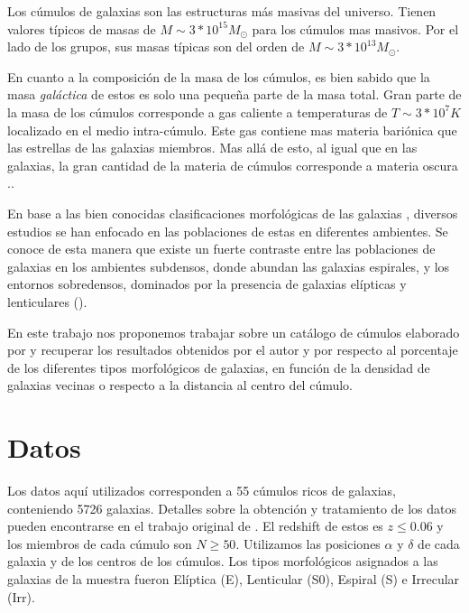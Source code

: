 \documentclass[a4paper,10pt]{article}
\begin{document}
Los c\'umulos de galaxias son las estructuras m\'as masivas del universo. Tienen valores t\'ipicos de masas de $M\sim 3*10^{15}M_{\odot}$ para los c\'umulos mas masivos. Por el lado de los grupos, sus masas t\'ipicas son del orden de $M\sim3*10^{13}M_{\odot}$. 

En cuanto a la composici\'on de la masa de los c\'umulos, es bien sabido que la masa \textit{gal\'actica} de estos es solo una peque\~na parte de la masa total. Gran parte de la masa de los c\'umulos corresponde a gas caliente a temperaturas de $T\sim3*10^{7}K$ localizado en el medio intra-c\'umulo. Este gas contiene mas materia bari\'onica que las estrellas de las galaxias miembros. Mas all\'a de esto, al igual que en las galaxias, la gran cantidad de la materia de c\'umulos corresponde a materia oscura \citep{Schneider}..

En base a las bien conocidas clasificaciones morfol\'ogicas de las galaxias \citep{Hubble1926}, diversos estudios se han enfocado en las poblaciones de estas en diferentes ambientes. Se conoce de esta manera que existe un fuerte contraste entre las poblaciones de galaxias en los ambientes subdensos, donde abundan las galaxias espirales, y los entornos sobredensos, dominados por la presencia de galaxias el\'ipticas y lenticulares (\citealt{Morgan1961,Abell1965}).  

En este trabajo nos proponemos trabajar sobre un cat\'alogo de c\'umulos elaborado por \citet{Dressler1980.catalogo} y recuperar los resultados obtenidos por el autor \citep{Dressler1980} y por \citet{Whitmore1993} respecto al porcentaje de los diferentes tipos morfol\'ogicos de galaxias, en funci\'on de la densidad de galaxias vecinas o respecto a la distancia al centro del c\'umulo. 

\section{Datos}

Los datos aqu\'i utilizados corresponden a 55 c\'umulos ricos de galaxias, conteniendo 5726 galaxias. Detalles sobre la obtenci\'on y tratamiento de los datos pueden encontrarse en el trabajo original de \citet{Dressler1980.catalogo}. El redshift de estos es $z\leq0.06$ y los miembros de cada c\'umulo son $N\geq50$. Utilizamos las posiciones $\alpha$ y $\delta$ de cada galaxia y de los centros de los c\'umulos. Los tipos morfol\'ogicos asignados a las galaxias de la muestra fueron El\'iptica (E), Lenticular (S0), Espiral (S) e Irrecular (Irr).
\end{document}
